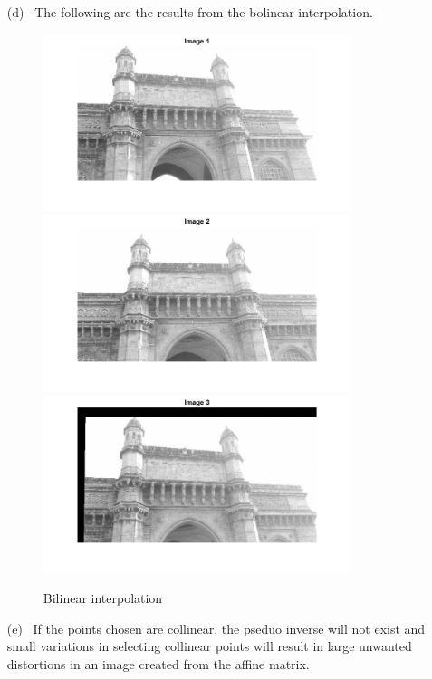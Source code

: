 \documentclass[11pt]{article}
\begin{document}
\begin{enumerate}
\begin{enumerate}
\pagebreak
\item[(d)] \
The following are the results from the bolinear interpolation.
\begin{figure}[!htb]
\centering
{}
  \includegraphics[width=9cm]{images/Im1.jpg}
  \endminipage\hfill
 \includegraphics[width=9cm]{images/Im2.jpg}
    \endminipage\hfill
  \includegraphics[width=9cm]{images/bilinear.jpg}
  \endminipage\hfill
\caption{Bilinear interpolation}
\end{figure}

\item[(e)] \
If the points chosen are collinear, the pseduo inverse will not exist and small variations in selecting collinear points will result in large unwanted distortions in an image created from the affine matrix. 
\end{enumerate}
\end{enumerate}
\end{document}
